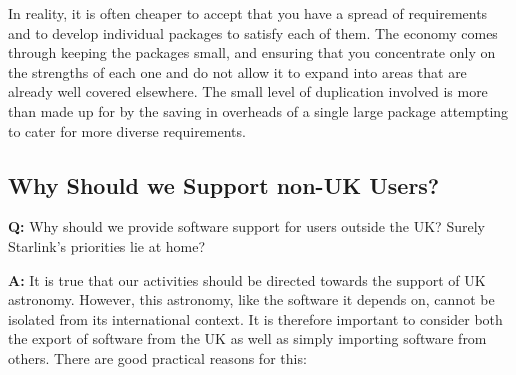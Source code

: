 In reality, it is often cheaper to accept that you have a spread of
requirements and to develop individual packages to satisfy each of
them. The economy comes through keeping the packages small, and
ensuring that you concentrate only on the strengths of each one and do
not allow it to expand into areas that are already well covered
elsewhere. The small level of duplication involved is more than made
up for by the saving in overheads of a single large package attempting
to cater for more diverse requirements.

\subsection{\label{foreign}Why Should we Support non-UK Users?}

{\Large \bf Q:} Why should we provide software support for users outside
the UK? Surely Starlink's priorities lie at home?

{\Large \bf A:} It is true that our activities should be
directed towards the support of UK astronomy. However, this astronomy,
like the software it depends on, cannot be isolated from its
international context. It is therefore important to consider both the
export of software from the UK as well as simply importing software
from others. There are good practical reasons for this:

